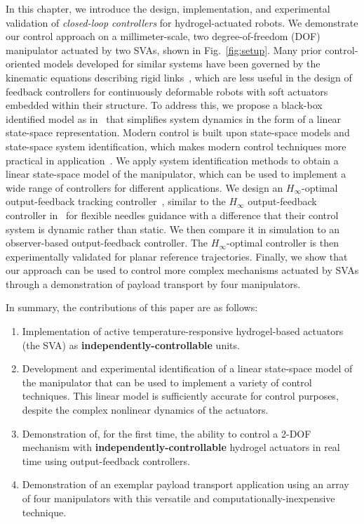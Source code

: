 In this chapter, we introduce the design, implementation, and experimental validation of {\it closed-loop controllers} for hydrogel-actuated robots. We demonstrate our control approach on a millimeter-scale, two degree-of-freedom (DOF) manipulator actuated by two SVAs, shown in Fig.~\ref{fig:setup}. Many prior control-oriented models developed for similar systems have been governed by the kinematic equations describing rigid links~\cite{Webster2010,RezayatSorkhabadi2019}, which are less useful in the design of feedback controllers for continuously deformable robots with soft actuators embedded within their structure. To address this, we propose a black-box identified model as in~\cite{Ljung2010,Schaller2020} that simplifies system dynamics in the form of a linear state-space representation. Modern control is built upon state-space models and state-space system identification, which  makes modern control techniques more practical in application~\cite{Lim1998,Chinimilli2020}. We apply system identification methods to obtain a linear state-space model of the manipulator, which can be used to implement a wide range of controllers for different applications. We design an $H_{\infty}$-optimal output-feedback tracking controller~\cite{Aastrom2010},  similar to the $H_{\infty}$ output-feedback controller in~\cite{Farhamfard2016} for flexible needles guidance with a difference that their control system is dynamic rather than static. We then compare it in simulation to an observer-based output-feedback controller. The $H_{\infty}$-optimal controller is then experimentally validated for planar reference trajectories. Finally, we show that our approach can be used to control more complex mechanisms actuated by SVAs through a demonstration of payload transport by four manipulators.

In summary, the contributions of this paper are as follows:

\begin{enumerate}
    \item Implementation of active temperature-responsive hydrogel-based actuators (the SVA) as \textbf{independently-controllable} units. 
   \item Development and experimental identification of a linear state-space model of the manipulator that can be used to implement a variety of control techniques. This linear model is sufficiently accurate for control purposes, despite the complex nonlinear dynamics of the actuators.
    \item Demonstration of, for the first time, the ability to control a 2-DOF mechanism with \textbf{independently-controllable} hydrogel actuators in real time using output-feedback controllers. 
    \item Demonstration of an exemplar payload transport application using an array of four manipulators with this versatile and computationally-inexpensive technique.
\end{enumerate}

